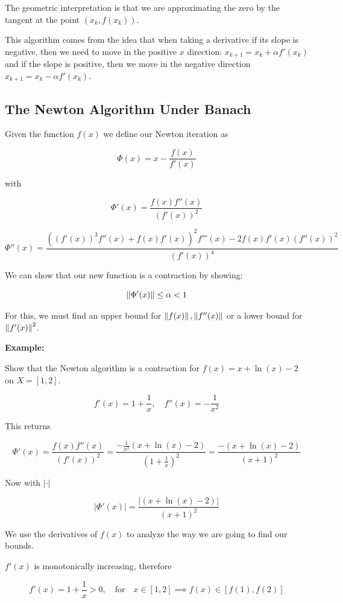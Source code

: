 The geometric interpretation is that we are approximating the zero by the tangent at the point
\((x_k, f(x_k))\). 

This algorithm comes from the idea that when taking a derivative if its slope is negative, then we need to move in the 
positive \(x\) direction: \(x_{k + 1} = x_k + \alpha f'(x_k)\) and if the slope is positive, then we move in the negative direction 
\(x_{k + 1} = x_k - \alpha f'(x_k)\).

\subsection{The Newton Algorithm Under Banach}

Given the function \(f(x)\) we define our Newton iteration as 

\[
    \Phi(x) = x - \frac{f(x)}{f'(x)}
\]

with 

\[
    \Phi'(x) = \frac{f(x)f''(x)}{(f'(x))^2} 
\]

\[
    \Phi''(x) = \frac{((f'(x))^3 f''(x) + f(x) f'(x))^2f'''(x) - 2f(x) f'(x)(f''(x))^2}{(f'(x))^4}
\]

We can show that our new function is a contraction by showing: 

\[
    \left\| \Phi'(x) \right\| \le \alpha < 1
\]

For this, we must find an upper bound for \(\left\| f(x) \right\|, \left\| f''(x) \right\|\) or a lower bound for \(\left\| f'(x) \right\|^2\).

\textbf{Example:}

Show that the Newton algorithm is a contraction for \(f(x) = x + \ln(x) - 2\) on \(X = [1, 2]\).

\[
    f'(x) = 1 + \frac{1}{x}, \quad f''(x) = -\frac{1}{x^2}
\]

This returns 

\[
    \Phi'(x) = \frac{f(x)f''(x)}{(f'(x))^2} = \frac{-\frac{1}{x^2}(x + \ln(x) - 2)}{\left(1 + \frac{1}{x}\right)^2} = \frac{-(x + \ln(x) - 2)}{\left(x + 1\right)^2}
\]

Now with \(|\cdot|\)

\[
    |\Phi'(x)| = \frac{|(x + \ln(x) - 2)|}{\left(x + 1\right)^2}
\]

We use the derivatives of \(f(x)\) to analyze the way we are going to find our bounds.

\(f'(x)\) is monotonically increasing, therefore

\[
    f'(x) = 1 + \frac{1}{x} > 0, \quad \text{for} \quad x \in [1, 2] \implies f(x) \in [f(1), f(2)] 
\]

